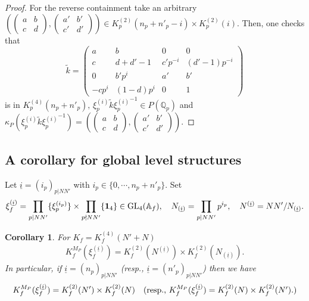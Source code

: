 \documentclass[11pt]{amsart}
\newtheorem{corollary}{Corollary}[section]
\newcommand{\mirf}[1]{K_f^{(4)}(#1)}
\newcommand{\congf}[1]{K_f^{(2)}(#1)}
\begin{document}
\begin{proof}
For the reverse containment take an arbitrary $\left( \left( \begin{smallmatrix}
	a & b \\ c & d
\end{smallmatrix}\right), \left( \begin{smallmatrix}
a' & b' \\ c' & d'
\end{smallmatrix}\right) \right) \in K_p^{(2)}(n_p+n'_p - i) \times K_p^{(2)}(i).$ Then, one checks that 
$$
\tilde{k} = \left( \begin{smallmatrix}
	a & b & 0 & 0 \\
	c & d + d'-1 & c'p^{-i} & (d'-1)p^{-i} \\
	0 & b'p^{i} & a' & b' \\
	-cp^i & (1-d)p^i & 0 & 1
\end{smallmatrix}\right)
$$ 
is in $K_p^{(4)}(n_p + n'_p), \,\xi_p^{(i)} \tilde{k} {\xi_p^{(i)}}^{-1} \in P(\mathbb{Q}_p)$ and 
$\kappa_P( \xi_p^{(i)} \tilde{k} {\xi_p^{(i)}}^{-1}) = 
\left( \left( \begin{smallmatrix}
	a & b \\ c & d
\end{smallmatrix}\right), \left( \begin{smallmatrix}
	a' & b' \\ c' & d'
\end{smallmatrix}\right) \right).$
\end{proof}

\subsection{A corollary for global level structures}

Let $\underline{i} = ( i_p)_{p|NN'}$ with $i_p \in \{0,\cdots, n_p + n'_p\}.$ Set 
$$	
\xi_f^{(\underline{i})} = \prod_{p|NN'} \{\xi_p^{(i_p)}\} \times \prod_{p \nmid NN'} \{\mathbf{1}_4\} \in {\rm GL}_4(\mathbb{A}_f), \quad 
N_{(\underline{i})} = \prod_{p | NN'} p^{i_p}, \quad 
N^{(\underline{i})} = NN'/N_{(\underline{i})}.
$$%

\begin{corollary}
\label{corollary: main-corollary-on-coset-reprentatives}
For $K_f = \mirf{N'+N}$
	\begin{gather*}
		K_f^{M_P}(\xi_f^{(\underline{i})}) = \congf{N^{(\underline{i})}} \times \congf{N_{(\underline{i})}}.
	\end{gather*}
In particular, if $\underline{i} = (n_p)_{p|NN'}$ \textup{(}{\rm resp.}, $\underline{i} = (n'_p)_{p|NN'}$\textup{)} then we have
$$
K_f^{M_P}{(\xi_f^{(\underline{i})})} = \congf{N'} \times \congf{N} \quad 
\mbox{\textup{(}{\rm resp.}, $K_f^{M_P}{(\xi_f^{(\underline{i})})} = \congf{N} \times \congf{N'}$.\textup{)}}
$$
\end{corollary}
\end{document}
